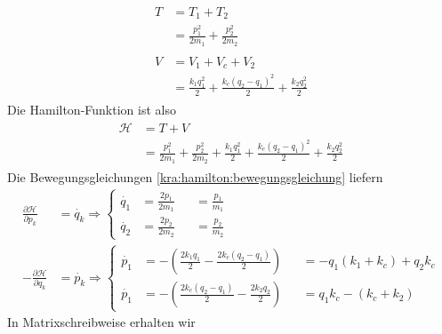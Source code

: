 \begin{align*}
    \begin{split}
        T   &= T_1 + T_2 \\
        &= \frac{p_1^2}{2m_1} + \frac{p_2^2}{2m_2}
    \end{split}
    \\
    \begin{split}
        V   &= V_1 + V_c + V_2 \\
        &= \frac{k_1 q_1^2}{2} + \frac{k_c (q_2 - q_1)^2}{2} + \frac{k_2 q_2^2}{2}
    \end{split}
\end{align*}
Die Hamilton-Funktion ist also
\begin{align*}
    \begin{split}
        \mathcal{H}     &= T + V \\
        &= \frac{p_1^2}{2m_1} + \frac{p_2^2}{2m_2} + \frac{k_1 q_1^2}{2} + \frac{k_c (q_2 - q_1)^2}{2} + \frac{k_2 q_2^2}{2}
    \end{split}
\end{align*}
Die Bewegungsgleichungen \ref{kra:hamilton:bewegungsgleichung} liefern
\begin{align*}
    \frac{\partial \mathcal{H}}{\partial p_k}  & = \dot{q_k}
    \Rightarrow
    \left\{
    \begin{alignedat}{2}
        \dot{q_1}   &= \frac{2p_1}{2m_1}    &&= \frac{p_1}{m_1}\\
        \dot{q_2}   &= \frac{2p_2}{2m_2}    &&= \frac{p_2}{m_2}
    \end{alignedat}
    \right.
    \\
    -\frac{\partial \mathcal{H}}{\partial q_k} & = \dot{p_k}
    \Rightarrow
    \left\{
    \begin{alignedat}{2}
        \dot{p_1}   &= -(\frac{2k_1q_1}{2} - \frac{2k_c(q_2-q_1)}{2})  &&= -q_1(k_1+k_c) + q_2k_c \\
        \dot{p_1}   &= -(\frac{2k_c(q_2-q_1)}{2} - \frac{2k_2q_2}{2})  &&= q_1k_c - (k_c + k_2)
    \end{alignedat}
    \right.
\end{align*}
In Matrixschreibweise erhalten wir
